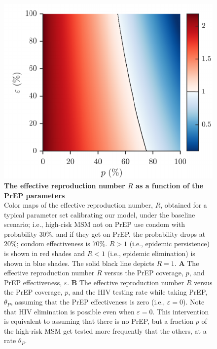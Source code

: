 \documentclass[11pt]{article}
\begin{document}
\newpage
\begin{figure}[H]
	\centering
	\includegraphics{Figures/Fig_S3}
	\caption[The effective reproduction number $R$ as a function of the PrEP parameters]{%
		{\bf The effective reproduction number $R$ as a function of the PrEP parameters}\\
	Color maps of the effective reproduction number, $R$, obtained for a typical parameter set calibrating our model, under the baseline scenario; i.e., high-risk MSM not on PrEP use condom with probability $30\%$, and if they get on PrEP, the probability drops at $20\%$; condom effectiveness is $70\%$. $R>1$ (i.e., epidemic persistence) is shown in red shades and $R<1$ (i.e., epidemic elimination) is shown in blue shades. The solid black line depicts $R=1$. {\bf A}  The effective reproduction number $R$ versus the PrEP coverage, $p$, and PrEP effectiveness, $\varepsilon$. {\bf B} The effective reproduction number $R$ versus the PrEP coverage, $p$, and the HIV testing rate while taking PrEP, $\theta_P$, assuming that the PrEP effectiveness is zero (i.e., $\varepsilon=0$). Note that HIV elimination is possible even when $\varepsilon=0$. This intervention is equivalent to assuming that there is no PrEP, but a fraction $p$ of the high-risk MSM get tested more frequently that the others, at a rate $\theta_P$.}
	\label{fig:R}
\end{figure}
\end{document}
